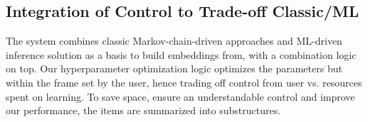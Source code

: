 \subsection{Integration of Control to Trade-off Classic/ML}
The system combines classic Markov-chain-driven approaches and ML-driven inference solution as a basis to build embeddings from, with a combination logic on top.
Our hyperparameter optimization logic optimizes the parameters but within the frame set by the user, hence trading off control from user vs. resources spent on learning. To save space, ensure an understandable control and improve our performance, the items are summarized into substructures.
%
% 








